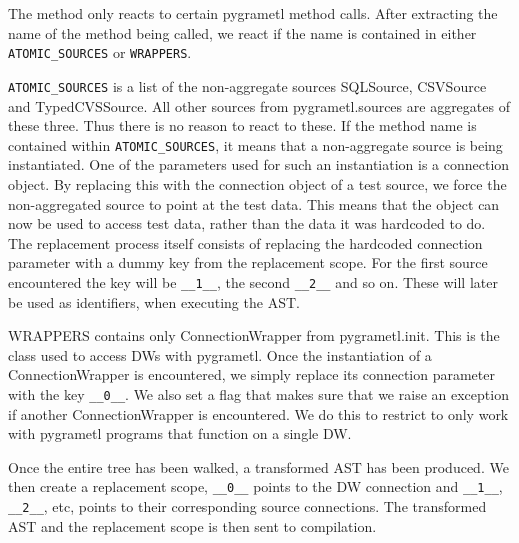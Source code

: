 
The method only reacts to certain pygrametl method calls. After extracting the name of the method being called, we react if the name is contained in either \texttt{ATOMIC\_SOURCES} or \texttt{WRAPPERS}.

\texttt{ATOMIC\_SOURCES} is a list of the non-aggregate sources SQLSource, CSVSource and TypedCVSSource. All other sources from pygrametl.sources are aggregates of these three. Thus there is no reason to react to these. If the method name is contained within \texttt{ATOMIC\_SOURCES}, it means that a non-aggregate source is being instantiated. One of the parameters used for such an instantiation is a connection object. By replacing this with the connection object of a test source, we force the non-aggregated source to point at the test data. This means that the object can now be used to access test data, rather than the data it was hardcoded to do. The replacement process itself consists of replacing the hardcoded connection parameter with a dummy key from the replacement scope. For the first source encountered the key will be \texttt{\_\_1\_\_}, the second \texttt{\_\_2\_\_} and so on. These will later be used as identifiers, when executing the AST.

WRAPPERS contains only ConnectionWrapper from pygrametl.init. This is the class used to access DWs with pygrametl. Once the instantiation of a ConnectionWrapper is encountered, we simply replace its connection parameter with the key \texttt{\_\_0\_\_}. We also set a flag that makes sure that we raise an exception if another ConnectionWrapper is encountered. We do this to restrict \FW{} to only work with pygrametl programs that function on a single DW.

Once the entire tree has been walked, a transformed AST has been produced. We then create a replacement scope, \texttt{\_\_0\_\_} points to the DW connection and \texttt{\_\_1\_\_}, \texttt{\_\_2\_\_}, etc, points to their corresponding source connections. The transformed AST and the replacement scope is then sent to compilation.

